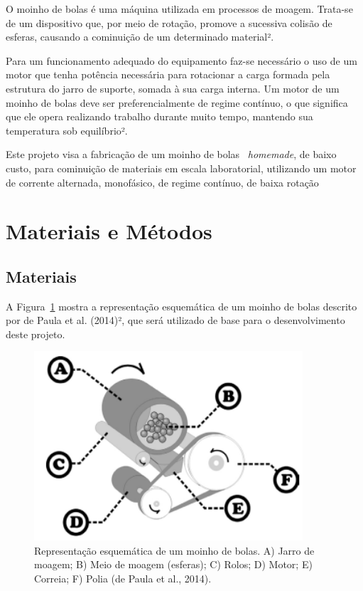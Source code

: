 \documentclass[a4paper, 12pt, brazil]{article}
\begin{document}
O moinho de bolas é uma máquina utilizada em processos de moagem. Trata-se de um dispositivo que, por meio de rotação, promove a sucessiva colisão de esferas, causando a cominuição de um determinado material².
\newline

Para um funcionamento adequado do equipamento faz-se necessário o uso de um motor que tenha potência necessária para rotacionar a carga formada pela estrutura do jarro de suporte, somada à sua carga interna. Um motor de um moinho de bolas deve ser preferencialmente de regime contínuo, o que significa que ele opera realizando trabalho durante muito tempo, mantendo sua temperatura sob equilíbrio².
\newline

Este projeto visa a fabricação de um moinho de bolas \ \textit{homemade}, de baixo custo, para cominuição de materiais em escala laboratorial, utilizando um motor de corrente alternada, monofásico, de regime contínuo, de baixa rotação

\section{Materiais e Métodos}
	\subsection{Materiais}
A Figura~\ref{fig:moinho} mostra a representação esquemática de um moinho de bolas descrito por de Paula et al. (2014)², que será utilizado de base para o desenvolvimento deste projeto.
	\begin{figure}[!ht]
 			\begin{center}
				\includegraphics[width=100mm,scale=0.5]{moinho.png}
			\end{center}
       		\caption{\label{fig:moinho} Representação esquemática de um moinho de bolas. A) Jarro de moagem; B) Meio de moagem (esferas); C) Rolos; D) Motor; E) Correia; F) Polia (de Paula et al., 2014).}
 	\end{figure}
    
\end{document}
